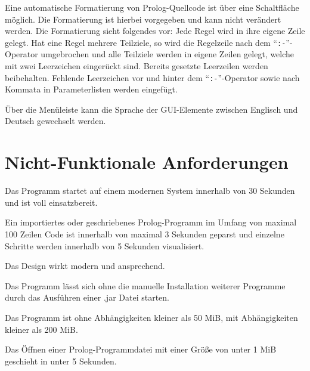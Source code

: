 \documentclass[parskip=full,11pt,twoside]{scrartcl}
\begin{document}
Eine automatische Formatierung von Prolog-Quellcode ist über eine Schaltfläche möglich. Die Formatierung ist hierbei vorgegeben und kann nicht verändert werden. Die Formatierung sieht folgendes vor: Jede Regel wird in ihre eigene Zeile gelegt. Hat eine Regel mehrere Teilziele, so wird die Regelzeile nach dem \enquote{\texttt{:-}}-Operator umgebrochen und alle Teilziele werden in eigene Zeilen gelegt, welche mit zwei Leerzeichen eingerückt sind. Bereits gesetzte Leerzeilen werden beibehalten. Fehlende Leerzeichen vor und hinter dem \enquote{\texttt{:-}}-Operator sowie nach Kommata in Parameterlisten werden eingefügt.


Über die Menüleiste kann die Sprache der GUI-Elemente zwischen Englisch und Deutsch gewechselt werden.

\section{Nicht-Funktionale Anforderungen}


Das Programm startet auf einem modernen System innerhalb von 30 Sekunden und ist voll einsatzbereit.


Ein importiertes oder geschriebenes Prolog-Programm im Umfang von maximal 100 Zeilen Code ist innerhalb von maximal 3 Sekunden geparst und einzelne Schritte werden innerhalb von 5 Sekunden visualisiert.


Das Design wirkt modern und ansprechend.


Das Programm lässt sich ohne die manuelle Installation weiterer Programme durch das Ausführen einer .jar Datei starten.


Das Programm ist ohne Abhängigkeiten kleiner als 50 MiB, mit Abhängigkeiten kleiner als 200 MiB.


Das Öffnen einer Prolog-Programmdatei mit einer Größe von unter 1 MiB geschieht in unter 5 Sekunden.
\end{document}
